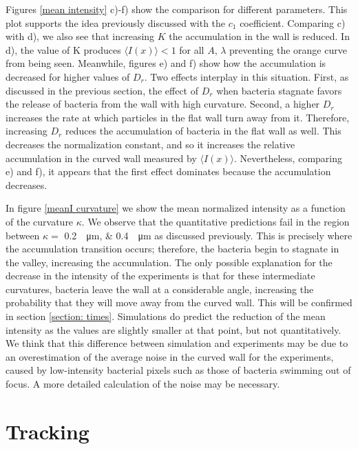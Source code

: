 Figures \ref{mean intensity} c)-f) show the comparison for different parameters. This plot supports the idea previously discussed with the $c_1$ coefficient. Comparing c) with d), we also see that increasing $K$ the accumulation in the wall is reduced. In d), the value of K produces $\langle I(x) \rangle <1$ for all $A$, $\lambda$ preventing the orange curve from being seen. Meanwhile, figures e) and f) show how the accumulation is decreased for higher values of $D_r$. Two effects interplay in this situation. First, as discussed in the previous section, the effect of $D_r$ when bacteria stagnate favors the release of bacteria from the wall with high curvature. Second, a higher $D_r$ increases the rate at which particles in the flat wall turn away from it. Therefore, increasing $D_r$ reduces the accumulation of bacteria in the flat wall as well. This decreases the normalization constant, and so it increases the relative accumulation in the curved wall measured by $\langle I(x) \rangle$. Nevertheless, comparing e) and f), it appears that the first effect dominates because the accumulation decreases.

In figure \ref{meanI curvature} we show the mean normalized intensity as a function of the curvature $\kappa$. We observe that the quantitative predictions fail in the region between $\kappa = $ \SIlist[list-units=single]{0.2;0.4}{\per\micro\meter} as discussed previously. This is precisely where the accumulation transition occurs; therefore, the bacteria begin to stagnate in the valley, increasing the accumulation. The only possible explanation for the decrease in the intensity of the experiments is that for these intermediate curvatures, bacteria leave the wall at a considerable angle, increasing the probability that they will move away from the curved wall. This will be confirmed in section \ref{section: times}. Simulations do predict the reduction of the mean intensity as the values are slightly smaller at that point, but not quantitatively. We think that this difference between simulation and experiments may be due to an overestimation of the average noise in the curved wall for the experiments, caused by low-intensity bacterial pixels such as those of bacteria swimming out of focus. A more detailed calculation of the noise may be necessary. 


\label{section: tracking}
\section{Tracking}

